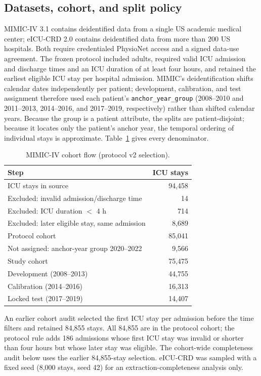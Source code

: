 \documentclass[journal]{IEEEtran}
\begin{document}
\subsection{Datasets, cohort, and split policy}

MIMIC-IV 3.1 contains deidentified data from a single US academic medical
center; eICU-CRD 2.0 contains deidentified data from more than 200 US
hospitals. Both require credentialed PhysioNet access and a signed data-use
agreement. The frozen protocol included adults, required valid ICU admission
and discharge times and an ICU duration of at least four hours, and retained
the earliest eligible ICU stay per hospital admission. MIMIC's
deidentification shifts calendar dates independently per patient;
development, calibration, and test assignment therefore used each patient's
\texttt{anchor\_year\_group} (2008--2010 and 2011--2013, 2014--2016, and
2017--2019, respectively) rather than shifted calendar years. Because the
group is a patient attribute, the splits are patient-disjoint; because it
locates only the patient's anchor year, the temporal ordering of individual
stays is approximate. Table~\ref{tab:flow} gives
every denominator.

\begin{table}[t]
\centering
\caption{MIMIC-IV cohort flow (protocol v2 selection).}
\label{tab:flow}
\footnotesize
\begin{tabular}{@{}lr@{}}
\toprule
Step & ICU stays \\
\midrule
ICU stays in source & 94,458 \\
\quad Excluded: invalid admission/discharge time & 14 \\
\quad Excluded: ICU duration $<$ 4 h & 714 \\
\quad Excluded: later eligible stay, same admission & 8,689 \\
Protocol cohort & 85,041 \\
\quad Not assigned: anchor-year group 2020--2022 & 9,566 \\
Study cohort & 75,475 \\
\quad Development (2008--2013) & 44,755 \\
\quad Calibration (2014--2016) & 16,313 \\
\quad Locked test (2017--2019) & 14,407 \\
\bottomrule
\end{tabular}
\end{table}

An earlier cohort audit selected the first ICU stay per admission before the
time filters and retained 84,855 stays. All 84,855 are in the protocol cohort;
the protocol rule adds 186 admissions whose first ICU stay was invalid or
shorter than four hours but whose later stay was eligible. The cohort-wide
completeness audit below uses the earlier 84,855-stay selection. eICU-CRD was
sampled with a fixed seed (8,000 stays, seed 42) for an extraction-completeness
analysis only.
\end{document}
